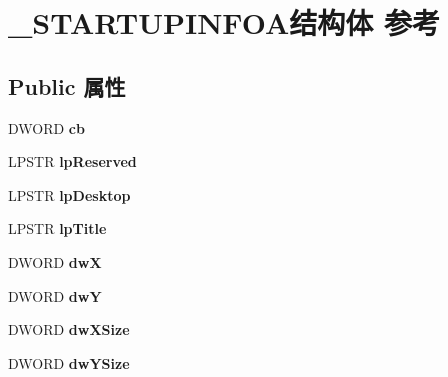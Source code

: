 \hypertarget{struct___s_t_a_r_t_u_p_i_n_f_o_a}{}\section{\+\_\+\+S\+T\+A\+R\+T\+U\+P\+I\+N\+F\+O\+A结构体 参考}
\label{struct___s_t_a_r_t_u_p_i_n_f_o_a}
\subsection*{Public 属性}
\begin{DoxyCompactItemize}
\item 
\mbox{\label{struct___s_t_a_r_t_u_p_i_n_f_o_a_a57ef6a41e6c75be0c756b36b5e6e39d8}} 
D\+W\+O\+RD {\bfseries cb}
\item 
\mbox{\label{struct___s_t_a_r_t_u_p_i_n_f_o_a_a5ad9b62a306f57c02aea1463de843e87}} 
L\+P\+S\+TR {\bfseries lp\+Reserved}
\item 
\mbox{\label{struct___s_t_a_r_t_u_p_i_n_f_o_a_afcacf4a8a969a134795b87ea83b45762}} 
L\+P\+S\+TR {\bfseries lp\+Desktop}
\item 
\mbox{\label{struct___s_t_a_r_t_u_p_i_n_f_o_a_a3141168c326f360f791479eac59c4ce0}} 
L\+P\+S\+TR {\bfseries lp\+Title}
\item 
\mbox{\label{struct___s_t_a_r_t_u_p_i_n_f_o_a_a061684c82c6eb7450d8bbeccf5eb0654}} 
D\+W\+O\+RD {\bfseries dwX}
\item 
\mbox{\label{struct___s_t_a_r_t_u_p_i_n_f_o_a_ae1efcccde106bd59ecfa0e51299066a4}} 
D\+W\+O\+RD {\bfseries dwY}
\item 
\mbox{\label{struct___s_t_a_r_t_u_p_i_n_f_o_a_a2d7e74924651d99d5fecf4e3467803db}} 
D\+W\+O\+RD {\bfseries dw\+X\+Size}
\item 
\mbox{\label{struct___s_t_a_r_t_u_p_i_n_f_o_a_a7587699b329c615d3f31cc858d46cffe}} 
D\+W\+O\+RD {\bfseries dw\+Y\+Size}
\item 

\end{DoxyCompactItemize}

